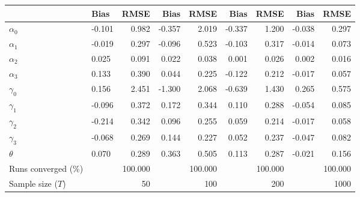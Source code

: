 
\begin{tabular}[t]{llrrrrrrr}
\toprule
  & Bias & RMSE & Bias & RMSE & Bias & RMSE & Bias & RMSE\\
\midrule
$\alpha_{0}$ & -0.101 & 0.982 & -0.357 & 2.019 & -0.337 & 1.200 & -0.038 & 0.297\\
$\alpha_{1}$ & -0.019 & 0.297 & -0.096 & 0.523 & -0.103 & 0.317 & -0.014 & 0.073\\
$\alpha_{2}$ & 0.025 & 0.091 & 0.022 & 0.038 & 0.001 & 0.026 & 0.002 & 0.016\\
$\alpha_{3}$ & 0.133 & 0.390 & 0.044 & 0.225 & -0.122 & 0.212 & -0.017 & 0.057\\
$\gamma_{0}$ & 0.156 & 2.451 & -1.300 & 2.068 & -0.639 & 1.430 & 0.265 & 0.575\\
$\gamma_{1}$ & -0.096 & 0.372 & 0.172 & 0.344 & 0.110 & 0.288 & -0.054 & 0.085\\
$\gamma_{2}$ & -0.214 & 0.342 & 0.096 & 0.255 & 0.059 & 0.214 & -0.017 & 0.058\\
$\gamma_{3}$ & -0.068 & 0.269 & 0.144 & 0.227 & 0.052 & 0.237 & -0.047 & 0.082\\
$\theta$ & 0.070 & 0.289 & 0.363 & 0.505 & 0.113 & 0.287 & -0.021 & 0.156\\
Runs converged (\%) &  & 100.000 &  & 100.000 &  & 100.000 &  & 100.000\\
Sample size ($T$) &  & 50 &  & 100 &  & 200 &  & 1000\\
\bottomrule
\end{tabular}
